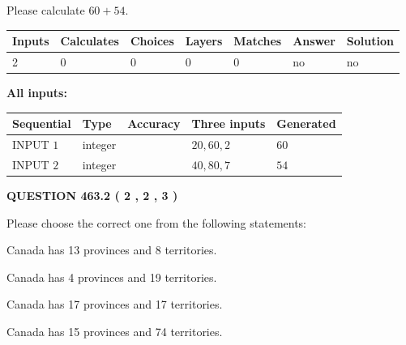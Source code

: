 \documentclass[12pt]{article}
\begin{document}
  
 
Please calculate $ %
60 +  %
54 $.
 
 
   
   
   
   
\noindent\begin{tabular}{|l|l|l|l|l|l|l|}
 \hline
Inputs & Calculates & Choices & Layers & Matches & Answer & Solution \\ \hline
 2  & 
 0  & 
 0
  & 
 0  & 
 0  & 
  no & 
  no 
  \\ \hline
 \end{tabular}
   
   
   
   
\noindent{}
   
   
   
   
\noindent\vspace{0.1in}\hspace{-0.08in} {\textbf{\Large{All inputs: }}}
   
   
  
  
\noindent\begin{tabular}{|l|l|l|l|l|}
\hline
 Sequential & Type & Accuracy & Three inputs & Generated \\ 
\hline
 
 
  INPUT $  1 $ & integer &  & $
 20
 , 
 60
 , 
 2
 $ & $ 60 $ 
 \\  \hline  
 
 
  INPUT $  2 $ & integer &  & $
 40
 , 
 80
 , 
 7
 $ & $ 54 $ 
 \\  \hline  
 \end{tabular}
   
   
  
\vspace{0.2in}
  
{\textbf{\Large{QUESTION
463.2 
 ( 2 , 2 , 3 )
}}}
  
  
Please choose the correct one from the following statements:
 
 
Canada has  13 provinces and  8 territories.
 
 
Canada has   4 provinces and  19 territories.
 
 
Canada has  17 provinces and  17 territories.
 
 
Canada has  15 provinces and  74 territories.
 
\end{document}
